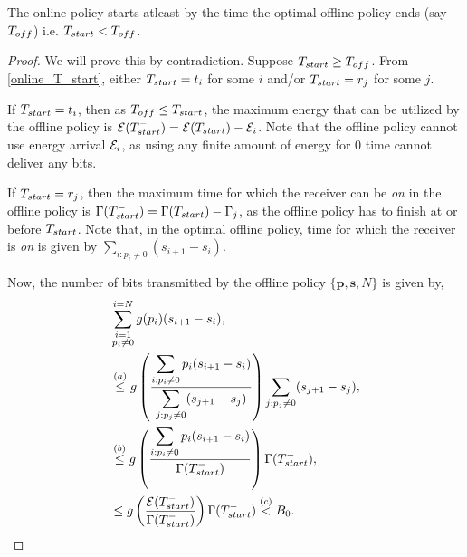 \begin{lemma}
The online policy starts atleast by the time the optimal offline policy ends (say $T_{\mbox{\scriptsize{off}}}$) i.e. $T_{\mbox{\scriptsize{start}}} <T_{\mbox{\scriptsize{off}}}$.
\label{onilne_time}
\end{lemma}

\begin{proof}
We will prove this by contradiction. Suppose $T_{\mbox{\scriptsize{start}}} \ge T_{\mbox{\scriptsize{off}}}$. From \eqref{online_T_start}, either $T_{\mbox{\scriptsize{start}}}=t_i$ for some $i$ and/or $T_{\mbox{\scriptsize{start}}}=r_j$ for some $j$.

If $T_{\mbox{\scriptsize{start}}}=t_i$, then as $T_{\mbox{\scriptsize{off}}}\le T_{\mbox{\scriptsize{start}}}$, the maximum energy that can be utilized by the offline policy is $\ETx(T_{\mbox{\scriptsize{start}}}^-)=\ETx(T_{\mbox{\scriptsize{start}}})-\ETx_i$. Note that the offline policy cannot use energy arrival $\mathcal{E}_i$, as using any finite amount of energy for 0 time cannot deliver any bits. 

If $T_{\mbox{\scriptsize{start}}}=r_j$, then the maximum time for which the receiver can be \textit{on} in the offline policy is $\TRx(T_{\mbox{\scriptsize{start}}}^-)=\TRx(T_{\mbox{\scriptsize{start}}})-\TRx_j$, as the offline policy has to finish at or before $T_{\mbox{\scriptsize{start}}}$. Note that, in the optimal offline policy, time for which the receiver is \textit{on} is given by $\displaystyle \sum_{i:p_i\neq 0}(s_{i+1}-s_i)$. 

Now, the number of bits transmitted by the offline policy $\{\bm{p},\bm{s},N\}$ is given by,
\begin{align}
&\sum_{{\substack{i=1\\p_i\neq 0}}}^{i=N} g(p_i)(s_{i+1}-s_{i}),
\\
&\nonumber \stackrel{(a)}{\le}g\left(\frac{\displaystyle\sum_{i:p_i\neq 0}p_i(s_{i+1}-s_{i})}{\displaystyle\sum_{j:p_j\neq 0}(s_{j+1}-s_{j})}\right)\sum_{j:p_j\neq 0} (s_{j+1}-s_{j}),
\\
&\nonumber\stackrel{(b)}{\le} g\left( \frac{\displaystyle\sum_{i:p_i\neq 0} p_i(s_{i+1}-s_{i})}{\TRx(T_{\mbox{\scriptsize{start}}}^-)} \right)\TRx(T_{\mbox{\scriptsize{start}}}^-), 
\\
&\le g\left(\frac{\ETx(T_{\mbox{\scriptsize{start}}}^-)}{\TRx(T_{\mbox{\scriptsize{start}}}^-)}\right)\TRx(T_{\mbox{\scriptsize{start}}}^-)\stackrel{(c)}{<}B_0.\label{online_eq_2}
\end{align}


\end{proof}
